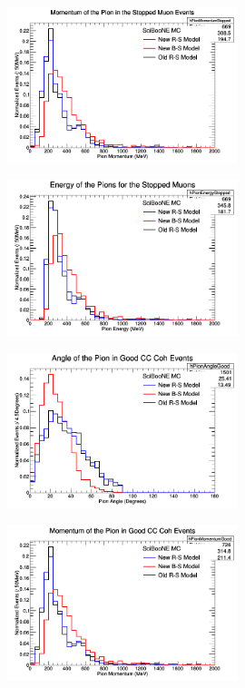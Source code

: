 \documentclass[11pt]{article}
\begin{document}
\begin{figure}[H]
\centering
\includegraphics[width=0.6\textwidth]{NMPionPlottingImages/5-NMPionPlotting.png}
\caption{}
\end{figure}

\begin{figure}[H]
\centering
\includegraphics[width=0.6\textwidth]{NMPionPlottingImages/6-NMPionPlotting.png}
\caption{}
\end{figure}

\begin{figure}[H]
\centering
\includegraphics[width=0.6\textwidth]{NMPionPlottingImages/7-NMPionPlotting.png}
\caption{}
\end{figure}

\begin{figure}[H]
\centering
\includegraphics[width=0.6\textwidth]{NMPionPlottingImages/8-NMPionPlotting.png}
\caption{}
\end{figure}
\end{document}
